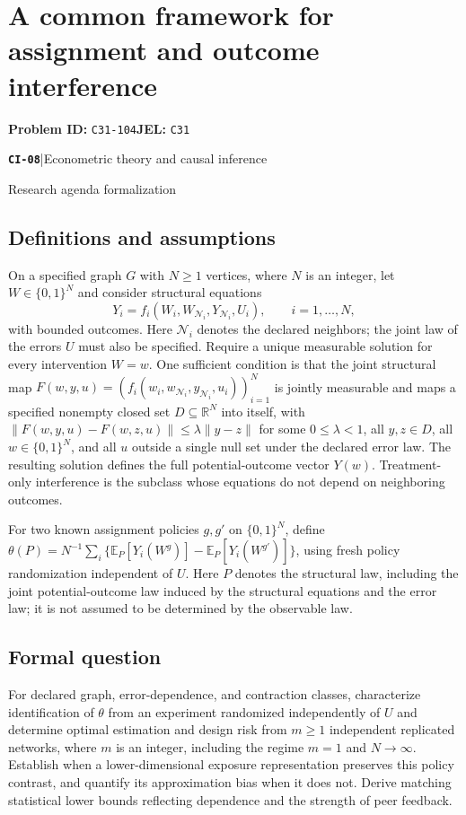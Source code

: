 \documentclass[11pt,a4paper]{article}
\newcommand{\R}{\mathbb R}
\newcommand{\E}{\mathbb E}
\newcommand{\entrymeta}[3]{{\sffamily\small\color{muted}\textbf{\texttt{#1}}\quad|\quad #2\par #3\par}}
\begin{document}
\section*{A common framework for assignment and outcome interference}
\textbf{Problem ID:} \texttt{C31-104}\quad \textbf{JEL:} \texttt{C31}\par
\label{problem:OP-0487}
\label{beyond:CI-08}
\entrymeta{CI-08}{Econometric theory and causal inference}{Research agenda formalization}
\subsection*{Definitions and assumptions}
On a specified graph $G$ with $N\geq1$ vertices, where $N$ is an integer, let $W\in\{0,1\}^N$ and consider structural equations
\[
Y_i=f_i(W_i,W_{\mathcal N_i},Y_{\mathcal N_i},U_i),
\qquad i=1,\ldots,N,
\]
with bounded outcomes. Here $\mathcal N_i$ denotes the declared neighbors; the joint law of the errors $U$ must also be specified. Require a unique measurable solution for every intervention $W=w$. One sufficient condition is that the joint structural map $F(w,y,u)=(f_i(w_i,w_{\mathcal N_i},y_{\mathcal N_i},u_i))_{i=1}^N$ is jointly measurable and maps a specified nonempty closed set $D\subseteq\R^N$ into itself, with $\|F(w,y,u)-F(w,z,u)\|\leq\lambda\|y-z\|$ for some $0\leq\lambda<1$, all $y,z\in D$, all $w\in\{0,1\}^N$, and all $u$ outside a single null set under the declared error law. The resulting solution defines the full potential-outcome vector $Y(w)$. Treatment-only interference is the subclass whose equations do not depend on neighboring outcomes.

For two known assignment policies $g,g'$ on $\{0,1\}^N$, define $\theta(P)=N^{-1}\sum_i\{\E_P[Y_i(W^g)]-\E_P[Y_i(W^{g'})]\}$, using fresh policy randomization independent of $U$. Here $P$ denotes the structural law, including the joint potential-outcome law induced by the structural equations and the error law; it is not assumed to be determined by the observable law.
\subsection*{Formal question}
For declared graph, error-dependence, and contraction classes, characterize identification of $\theta$ from an experiment randomized independently of $U$ and determine optimal estimation and design risk from $m\geq1$ independent replicated networks, where $m$ is an integer, including the regime $m=1$ and $N\to\infty$. Establish when a lower-dimensional exposure representation preserves this policy contrast, and quantify its approximation bias when it does not. Derive matching statistical lower bounds reflecting dependence and the strength of peer feedback.
\end{document}
